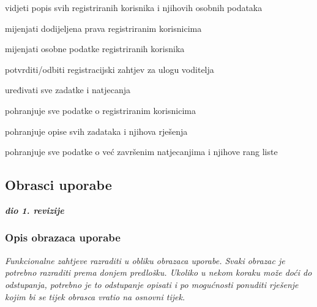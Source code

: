 \begin{packed_enum}
\begin{packed_enum}
		\item vidjeti popis svih registriranih korisnika i njihovih osobnih podataka
		\item mijenjati dodijeljena prava registriranim korisnicima
		\item mijenjati osobne podatke registriranih korisnika
		\item potvrditi/odbiti registracijski zahtjev za ulogu voditelja
		\item uređivati sve zadatke i natjecanja
		
	\end{packed_enum}
	
	\item  {}
	
	\begin{packed_enum}
		
		\item pohranjuje sve podatke o registriranim korisnicima
		\item pohranjuje opise svih zadataka i njihova rješenja
		\item pohranjuje sve podatke o već završenim natjecanjima i njihove rang liste
		
	\end{packed_enum}
\end{packed_enum}

\eject 
			
				
			\subsection{Obrasci uporabe}
				
				\textbf{\textit{dio 1. revizije}}
				
				\subsubsection{Opis obrazaca uporabe}
					\textit{Funkcionalne zahtjeve razraditi u obliku obrazaca uporabe. Svaki obrazac je potrebno razraditi prema donjem predlošku. Ukoliko u nekom koraku može doći do odstupanja, potrebno je to odstupanje opisati i po mogućnosti ponuditi rješenje kojim bi se tijek obrasca vratio na osnovni tijek.}\\
					

